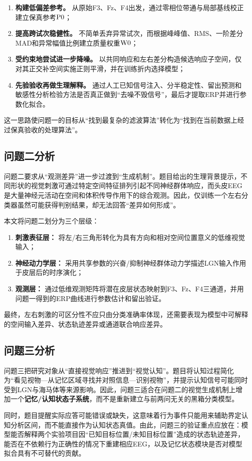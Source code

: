\begin{enumerate}[label=(\arabic*)]
    \item \textbf{构建低偏差参考。} 从原始F3、Fz、F4出发，通过零相位带通与局部基线校正建立保真参考$\mathrm{P0}$；
    \item \textbf{提高跨试次稳健性。} 不简单丢弃异常试次，而根据峰峰值、RMS、一阶差分MAD和异常幅值比例建立质量权重$\mathrm{W0}$；
    \item \textbf{受约束地尝试进一步降噪。} 以共同响应和左右差分构造候选响应子空间，仅对其正交补空间实施正则平滑，并在训练折内选择模型；
    \item \textbf{先验验收再做生理解释。} 通过人工已知信号注入、分半稳定性、留出预测和敏感性分析检验方法是否真正做到“去噪不毁信号”，最后才提取ERP并进行参数化拟合。
\end{enumerate}

这一思路使问题一的目标从“找到最复杂的滤波算法”转化为“找到在当前数据上经过保真验收的处理算法”。

\subsection{问题二分析}

问题二要求从“观测差异”进一步过渡到“生成机制”。题目给出的生理背景提示，不同形状的视觉刺激可通过特定空间特征排列引起不同神经群体响应，而头皮EEG是大量神经元活动在空间和体积传导作用下的综合观测。因此，仅训练一个左右分类器虽然可能获得判别结果，却无法回答“差异如何形成”。

本文将问题二划分为三个层级：

\begin{enumerate}[label=(\arabic*)]
    \item \textbf{刺激表征层：} 将左/右三角形转化为具有方向和相对空间位置意义的低维视觉输入；
    \item \textbf{神经动力学层：} 采用共享参数的兴奋/抑制神经群体动力学描述LGN输入作用于皮层后的时序演化；
    \item \textbf{观测层：} 通过低维观测矩阵将潜在皮层状态映射到F3、Fz、F4三通道，并用问题一得到的ERP曲线进行参数估计和留出验证。
\end{enumerate}

最终，左右刺激的可区分性不应只由分类准确率体现，还需要表现为模型中可解释的空间输入差异、状态轨迹差异或通道联合响应差异。

\subsection{问题三分析}

问题三把研究对象从“直接视觉响应”推进到“视觉认知”。题目将认知过程简化为“看见视物—从记忆区域寻找并对照信息—识别视物”，并提示认知信号可能同时受到LGN与海马体等来源影响。因此，问题三适合在问题二的视觉生成机制上增加一个\textbf{记忆/认知状态子系统}，而不是重新建立与前两问无关的黑箱分类模型。

同时，题目提醒实际应答可能错误或缺失，这意味着行为事件只能用来辅助界定认知分析区间，而不能直接作为认知状态真值。由此，问题三的验证重点应放在：模型能否解释两个实验项目因“已知目标位置/未知目标位置”造成的状态轨迹差异，能否在不依赖行为正确性的情况下重建相应EEG，以及记忆状态模块是否对模型拟合具有不可替代的贡献。
